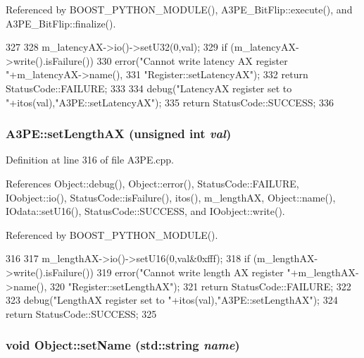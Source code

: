 Referenced by BOOST\_\-PYTHON\_\-MODULE(), A3PE\_\-BitFlip::execute(), and A3PE\_\-BitFlip::finalize().


\begin{DoxyCode}
327                                              {
328   m_latencyAX->io()->setU32(0,val);
329   if (m_latencyAX->write().isFailure()){
330     error("Cannot write latency AX register "+m_latencyAX->name(),
331         "Register::setLatencyAX");
332     return StatusCode::FAILURE;
333   }
334   debug("LatencyAX register set to "+itos(val),"A3PE::setLatencyAX");
335   return StatusCode::SUCCESS;
336 }
\end{DoxyCode}
\hypertarget{classA3PE_a0300aa5c5ed02b82275c1de434196b9a}{
\subsubsection[{setLengthAX}]{ A3PE::setLengthAX (unsigned int {\em val})}}
\label{classA3PE_a0300aa5c5ed02b82275c1de434196b9a}


Definition at line 316 of file A3PE.cpp.

References Object::debug(), Object::error(), StatusCode::FAILURE, IOobject::io(), StatusCode::isFailure(), itos(), m\_\-lengthAX, Object::name(), IOdata::setU16(), StatusCode::SUCCESS, and IOobject::write().

Referenced by BOOST\_\-PYTHON\_\-MODULE().


\begin{DoxyCode}
316                                             {
317   m_lengthAX->io()->setU16(0,val&0xfff);
318   if (m_lengthAX->write().isFailure()){
319     error("Cannot write length AX register "+m_lengthAX->name(),
320         "Register::setLengthAX");
321     return StatusCode::FAILURE;
322   }
323   debug("LengthAX register set to "+itos(val),"A3PE::setLengthAX");
324   return StatusCode::SUCCESS;
325 }
\end{DoxyCode}
\hypertarget{classObject_ae30fea75683c2d149b6b6d17c09ecd0c}{
\subsubsection[{setName}]{\setlength{\rightskip}{0pt plus 5cm}void Object::setName (std::string {\em name})}}
\label{classObject_ae30fea75683c2d149b6b6d17c09ecd0c}


